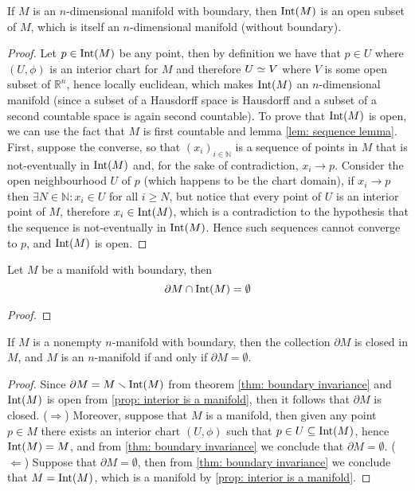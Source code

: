 \begin{proposition}\label{prop: interior is a manifold}
  If \(M\) is an \(n\)-dimensional manifold with boundary, then \(\operatorname{Int}(M)\) is
  an open subset of \(M\), which is itself an \(n\)-dimensional manifold
  (without boundary).
\end{proposition}

\begin{proof}
  Let \(p \in \operatorname{Int}(M)\) be any point, then by definition we have that \(p \in
  U\) where \((U, \phi)\) is an interior chart for \(M\) and therefore \(U \simeq
  V\) where \(V\) is some open subset of \(\mathbb{R}^n\), hence locally
  euclidean, which makes \(\operatorname{Int}(M)\) an \(n\)-dimensional manifold (since a
  subset of a Hausdorff space is Hausdorff and a subset of a second countable
  space is again second countable). To prove that \(\operatorname{Int}(M)\) is open, we can
  use the fact that \(M\) is first countable and lemma \cref{lem: sequence
  lemma}. First, suppose the converse, so that \((x_i)_{i \in \mathbb{N}}\) is a
  sequence of points in \(M\) that is not-eventually in \(\operatorname{Int}(M)\) and, for the
  sake of contradiction, \(x_i \to p\). Consider the open neighbourhood \(U\) of
  \(p\) (which happens to be the chart domain), if \(x_i \to p\) then \(\exists
  N \in \mathbb{N}: x_i \in U\) for all \(i \geq N\), but notice that every
  point of \(U\) is an interior point of \(M\), therefore \(x_i \in \operatorname{Int}(M)\),
  which is a contradiction to the hypothesis that the sequence is not-eventually
  in \(\operatorname{Int}(M)\). Hence such sequences cannot converge to \(p\), and \(\operatorname{Int}(M)\)
  is open.
\end{proof}

\begin{theorem}\label{thm: boundary invariance}
  Let \(M\) be a manifold with boundary, then 
  \[
    \partial M \cap \operatorname{Int}(M) = \emptyset
  \]
\end{theorem}

\begin{proof}
\end{proof}

\begin{corollary}
  If \(M\) is a nonempty \(n\)-manifold with boundary, then the collection
  \(\partial M\) is closed in \(M\), and \(M\) is an \(n\)-manifold if and only
  if \(\partial M = \emptyset\).
\end{corollary}

\begin{proof}
  Since \(\partial M = M \smallsetminus \operatorname{Int}(M)\) from theorem \cref{thm: boundary
  invariance} and \(\operatorname{Int}(M)\) is open from \cref{prop: interior is a manifold},
  then it follows that \(\partial M\) is closed. (\(\Rightarrow\)) Moreover,
  suppose that \(M\) is a manifold, then given any point \(p \in M\) there
  exists an interior chart \((U, \phi)\) such that \(p \in U \subseteq
  \operatorname{Int}(M)\), hence \(\operatorname{Int}(M) = M\), and from \cref{thm: boundary invariance} we
  conclude that \(\partial M = \emptyset\). (\(\Leftarrow\)) Suppose that
  \(\partial M = \emptyset\), then from \cref{thm: boundary invariance} we
  conclude that \(M = \operatorname{Int}(M)\), which is a manifold by \cref{prop: interior is a
  manifold}.
\end{proof}
